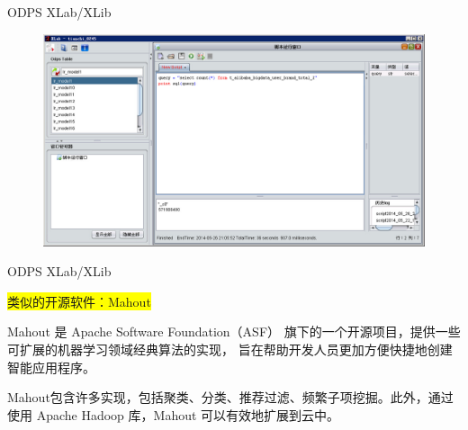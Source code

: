 \documentclass{beamer}
\begin{document}
\begin{frame}{ODPS XLab/XLib}

\begin{figure}
\includegraphics[width=\linewidth]{./XLab_script}
\end{figure}

\end{frame}

\begin{frame}{ODPS XLab/XLib}

\colorbox{yellow}{类似的开源软件：Mahout}

\vspace{1em}

Mahout 是 Apache Software Foundation（ASF） 旗下的一个开源项目，提供一些可扩展的机器学习领域经典算法的实现，
旨在帮助开发人员更加方便快捷地创建智能应用程序。

\vspace{1em}

Mahout包含许多实现，包括聚类、分类、推荐过滤、频繁子项挖掘。此外，通过使用 Apache Hadoop 库，Mahout 可以有效地扩展到云中。

\end{frame}
\end{document}
